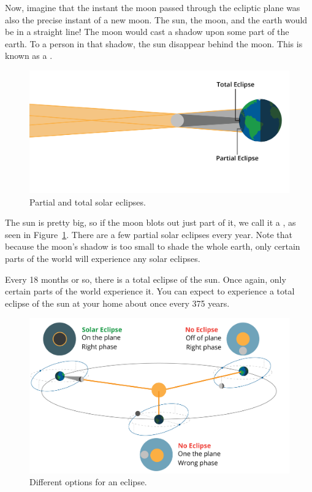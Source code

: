 Now, imagine that the instant the moon passed through the ecliptic plane was also the precise instant of a new moon. The sun,  the moon, and the earth would be in a straight line!  The moon would cast a shadow upon some part of the earth.  To a person in that shadow,  the sun disappear behind the moon.   This is known as a .
\begin{figure}[htbp]
    \centering
    \includegraphics[width=.75\textwidth]{eclipseShadows.png}
    \caption{Partial and total solar eclipses.}
    \label{fig:eclipseShadows}
\end{figure}



The sun is pretty big, so if the moon blots out just part of it,  we call it a , as seen in Figure~\ref{fig:eclipseShadows}. There are a few partial solar eclipses every year. Note that because the moon's shadow is too small to shade the whole earth, only certain parts of the world will experience any solar eclipses. 


Every 18 months or so, there is a total eclipse of the sun. Once again, only certain parts of the world experience it. You can expect to experience a total eclipse of the sun at your home about once every 375 years.

\begin{figure}[htbp]
    \centering
    \includegraphics[width=.75\textwidth]{eclipseOptions.png}
    \caption{Different options for an eclipse.}
    \label{fig:eclipseOptions}
\end{figure}

